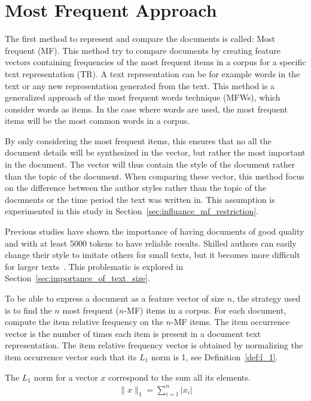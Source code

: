 \section{Most Frequent Approach}

The first method to represent and compare the documents is called: Most frequent (MF).
This method try to compare documents by creating feature vectors containing frequencies of the most frequent items in a corpus for a specific text representation (TR).
A text representation can be for example words in the text or any new representation generated from the text.
This method is a generalized approach of the most frequent words technique (MFWs), which consider words as items.
In the case where words are used, the most frequent items will be the most common words in a corpus.

By only considering the most frequent items, this ensures that no all the document details will be synthesized in the vector, but rather the most important in the document.
The vector will thus contain the style of the document rather than the topic of the document.
When comparing these vector, this method focus on the difference between the author styles rather than the topic of the documents or the time period the text was written in.
This assumption is experimented in this study in Section~\ref{sec:influance_mf_restriction}.

Previous studies have shown the importance of having documents of good quality and with at least 5000 tokens to have reliable results.
Skilled authors can easily change their style to imitate others for small texts, but it becomes more difficult for larger texts~\cite{savoy_stylo}.
This problematic is explored in Section~\ref{sec:importance_of_text_size}.

To be able to express a document as a feature vector of size $n$, the strategy used is to find the $n$ most frequent ($n$-MF) items in a corpus.
For each document, compute the item relative frequency on the $n$-MF items.
The item occurrence vector is the number of times each item is present in a document text representation.
The item relative frequency vector is obtained by normalizing the item occurrence vector such that its $L_1$ norm is 1, see Definition~\ref{def:l_1}.

\begin{definition}[$L_1$ norm]
  \label{def:l_1}
  The $L_1$ norm for a vector $x$ correspond to the sum all its elements.
  \begin{gather*}
    \|x\|_{1} = \sum _{i=1}^{n} \left| x_{i} \right|
  \end{gather*}
\end{definition}


